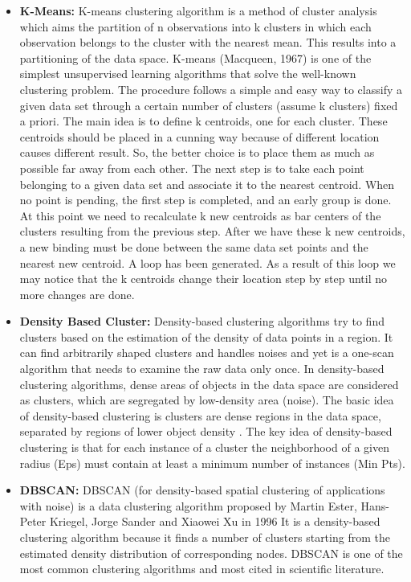 \begin{itemize}
\item	\textbf{K-Means:}
K-means clustering algorithm \cite{HitchcockKmeans} is a method of cluster analysis which aims the partition of n observations into k clusters in which each observation belongs to the cluster with the nearest mean. This results into a partitioning of the data space. K-means (Macqueen, 1967) is one of the simplest unsupervised learning algorithms that solve the well-known clustering problem. The procedure follows a simple and easy way to classify a given data set through a certain number of clusters (assume k clusters) fixed a priori. The main idea is to define k centroids, one for each cluster. These centroids should be placed in a cunning way because of different location causes different result. So, the better choice is to place them as much as possible far away from each other. The next step is to take each point belonging to a given data set and associate it to the nearest centroid. When no point is pending, the first step is completed, and an early group is done. At this point we need to recalculate k new centroids as bar centers of the clusters resulting from the previous step. After we have these k new centroids, a new binding must be done between the same data set points and the nearest new centroid. A loop has been generated. As a result of this loop we may notice that the k centroids change their location step by step until no more changes are done.

 
\item	\textbf{Density Based Cluster:}
Density-based clustering algorithms \cite{WekaCC} try to find clusters based on the estimation of the density of data points in a region.
It can find arbitrarily shaped clusters and handles noises and yet is a one-scan algorithm that needs to examine the raw data only once. In density-based clustering algorithms, dense areas of objects in the data space are considered as clusters, which are segregated by low-density area (noise). The basic idea of density-based clustering is clusters are dense regions in the data space, separated by regions of lower object density \cite{WEKATalankiDensity}.
The key idea of density-based clustering is that for each instance of a cluster the neighborhood of a given radius (Eps) must contain at least a minimum number of instances (Min Pts).

\item	\textbf{DBSCAN:}
DBSCAN (for density-based spatial clustering of applications with noise) is a data clustering algorithm proposed by Martin Ester, Hans-Peter Kriegel, Jorge Sander and Xiaowei Xu in 1996 It is a density-based clustering algorithm because it finds a number of clusters starting from the estimated density distribution of corresponding nodes. DBSCAN \cite{Kisilevich2010PDBSCANAD} is one of the most common clustering algorithms and most cited in scientific literature.
\end{itemize}

